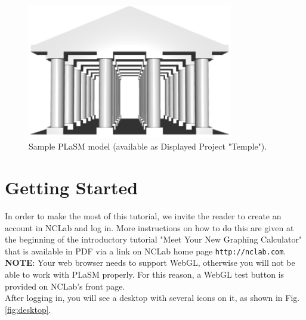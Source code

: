 \documentclass[article,A4,12pt]{llncs}
\begin{document}
\begin{figure}[!ht]
\begin{center}
\includegraphics[width=0.8\textwidth]{img/temple0.png}
\end{center}
\vspace{-2mm}
\caption{Sample PLaSM model (available as Displayed Project "Temple").}
\label{fig:pisa}
\end{figure}

\section{Getting Started}

In order to make the most of this tutorial, we invite the 
reader to create an account in NCLab and log in. More instructions 
on how to do this are given at the beginning of the introductory 
tutorial "Meet Your New Graphing Calculator" that is available in 
PDF via a link on NCLab home page {\tt http://nclab.com}. \\

\noindent
{\bf NOTE}: Your web browser needs to support WebGL, otherwise you will not be able to 
work with PLaSM properly. For this reason, a WebGL test button is provided 
on NCLab's front page.\\

\noindent
After logging in, you will see a desktop with several icons on it,
as shown in Fig. \ref{fig:desktop}. 
\end{document}
